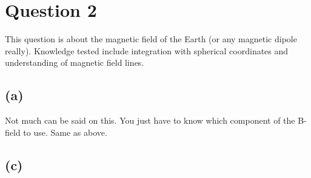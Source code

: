 \documentclass[a4paper]{article}
\begin{document}
\section*{Question 2}
This question is about the magnetic field of the Earth (or any magnetic dipole really). Knowledge tested include integration with spherical coordinates and understanding of magnetic field lines.
\subsection{(a)}
Not much can be said on this. You just have to know which component of the B-field to use. 
Same as above.
\subsection{(c)}
\end{document}
